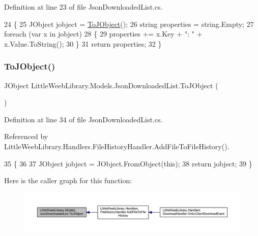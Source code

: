 Definition at line 23 of file Json\+Downloaded\+List.\+cs.


\begin{DoxyCode}
24         \{
25             JObject jobject = \mbox{\hyperlink{class_little_weeb_library_1_1_models_1_1_json_downloaded_list_a97de2493e2a60e3d98bd480c311a08b9}{ToJObject}}();
26             \textcolor{keywordtype}{string} properties = \textcolor{keywordtype}{string}.Empty;
27             \textcolor{keywordflow}{foreach} (var x \textcolor{keywordflow}{in} jobject)
28             \{
29                 properties += x.Key + \textcolor{stringliteral}{": "} + x.Value.ToString();
30             \}
31             \textcolor{keywordflow}{return} properties;
32         \}
\end{DoxyCode}
\mbox{\label{class_little_weeb_library_1_1_models_1_1_json_downloaded_list_a97de2493e2a60e3d98bd480c311a08b9}} 
\subsubsection{\texorpdfstring{To\+J\+Object()}{ToJObject()}}
{\footnotesize\ttfamily J\+Object Little\+Weeb\+Library.\+Models.\+Json\+Downloaded\+List.\+To\+J\+Object (\begin{DoxyParamCaption}{ }\end{DoxyParamCaption})}



Definition at line 34 of file Json\+Downloaded\+List.\+cs.



Referenced by Little\+Weeb\+Library.\+Handlers.\+File\+History\+Handler.\+Add\+File\+To\+File\+History().


\begin{DoxyCode}
35         \{
36 
37             JObject jobject = JObject.FromObject(\textcolor{keyword}{this});
38             \textcolor{keywordflow}{return} jobject;
39         \}
\end{DoxyCode}
Here is the caller graph for this function\+:\nopagebreak
\begin{figure}[H]
\begin{center}
\leavevmode
\includegraphics[width=350pt]{class_little_weeb_library_1_1_models_1_1_json_downloaded_list_a97de2493e2a60e3d98bd480c311a08b9_icgraph}
\end{center}
\end{figure}


